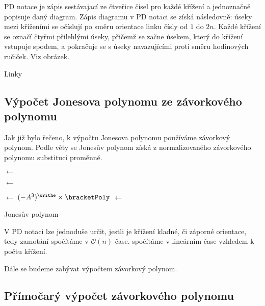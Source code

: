 PD notace je zápis sestávajací ze čtveřice čísel pro každé křížení a jednoznačně popisuje daný diagram. Zápis diagramu v PD notaci se získá následovně: úseky mezi kříženími se očíslují po směru orientace linku čísly od $1$ do $2 n$. Každé křížení se označí čtyřmi přilehlými úseky, přičemž se začne úsekem, který do křížení vstupuje spodem, a pokračuje se s úseky navazujícími proti směru hodinových ručiček. Viz obrázek.

Linky

\subsection{Výpočet Jonesova polynomu ze závorkového polynomu}

Jak již bylo řečeno, k výpočtu Jonesova polynomu používáme závorkový polynom. Podle věty se Jonesův polynom získá z normalizovaného závorkového polynomu substitucí proměnné. 

\begin{algorithm}[H]
\DontPrintSemicolon
{}


\BlankLine

\bracketPoly $\leftarrow$ 

\writhe $\leftarrow$ 

\normal $\leftarrow$ $ (-A^3)^{\writhe} \times \bracketPoly $
\jones $\leftarrow$ 

\KwRet \jones 

\caption{Jonesův polynom} 
\end{algorithm}

V PD notaci lze jednoduše určit, jestli je křížení kladné, či záporné orientace, tedy zamotání spočítáme v $\mathcal{O} (n)$ čase.
spočítáme v lineárním čase vzhledem k počtu křížení.

Dále se budeme zabývat výpočtem závorkový polynom.



\subsection{Přímočarý výpočet závorkového polynomu}

